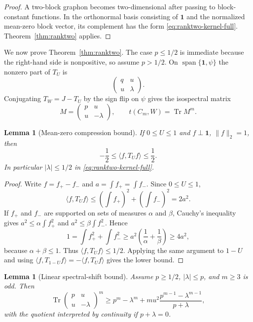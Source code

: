 \documentclass[11pt]{article}
\newtheorem{lemma}[theorem]{Lemma}
\newcommand{\one}{\mathbf 1}
\newcommand{\Tr}{\operatorname{Tr}}
\begin{document}
\begin{proof}
A two-block graphon becomes two-dimensional after passing to block-constant functions.  In the orthonormal basis consisting of $\one$ and the normalized mean-zero block vector, its complement has the form \eqref{eq:ranktwo-kernel-full}.  Theorem~\ref{thm:ranktwo} applies.
\end{proof}

We now prove Theorem~\ref{thm:ranktwo}.  The case $p\le1/2$ is immediate because the right-hand side is nonpositive, so assume $p>1/2$.  On $\operatorname{span}\{\one,\psi\}$ the nonzero part of $T_U$ is
\[
        \begin{pmatrix}q&u\\ u&\lambda\end{pmatrix}.
\]
Conjugating $T_W=J-T_U$ by the sign flip on $\psi$ gives the isospectral matrix
\begin{equation}\label{eq:ranktwo-M}
        M=\begin{pmatrix}p&u\\ u&-\lambda\end{pmatrix},
        \qquad t(C_m,W)=\Tr M^m.
\end{equation}

\begin{lemma}[Mean-zero compression bound]\label{lem:half-bound-full}
If $0\le U\le1$ and $f\perp\one$, $\|f\|_2=1$, then
\[
        -\frac12\le\langle f,T_Uf\rangle\le\frac12.
\]
In particular $|\lambda|\le1/2$ in \eqref{eq:ranktwo-kernel-full}.
\end{lemma}

\begin{proof}
Write $f=f_+-f_-$ and $a=\int f_+=\int f_-$.  Since $0\le U\le1$,
\[
        \langle f,T_Uf\rangle
        \le \left(\int f_+\right)^2+\left(\int f_-\right)^2=2a^2.
\]
If $f_+$ and $f_-$ are supported on sets of measures $\alpha$ and $\beta$, Cauchy's inequality gives $a^2\le\alpha\int f_+^2$ and $a^2\le\beta\int f_-^2$.  Hence
\[
        1=\int f_+^2+\int f_-^2\ge a^2\left(\frac1\alpha+\frac1\beta\right)\ge4a^2,
\]
because $\alpha+\beta\le1$.  Thus $\langle f,T_Uf\rangle\le1/2$.  Applying the same argument to $1-U$ and using $\langle f,T_{1-U}f\rangle=-\langle f,T_Uf\rangle$ gives the lower bound.
\end{proof}

\begin{lemma}[Linear spectral-shift bound]\label{lem:linear-shift-full}
Assume $p\ge1/2$, $|\lambda|\le p$, and $m\ge3$ is odd.  Then
\[
        \Tr\begin{pmatrix}p&u\\ u&-\lambda\end{pmatrix}^m
        \ge
        p^m-\lambda^m
        +m u^2\frac{p^{m-1}-\lambda^{m-1}}{p+\lambda},
\]
with the quotient interpreted by continuity if $p+\lambda=0$.
\end{lemma}
\end{document}
